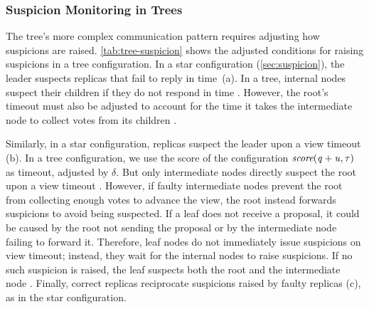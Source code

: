 \subsubsection{Suspicion Monitoring in Trees}
\label{sec:tree-suspicion}

The tree's more complex communication pattern requires adjusting how suspicions are raised.
\cref{tab:tree-suspicion} shows the adjusted conditions for raising suspicions in a tree configuration.
In a star configuration (\cref{sec:suspicion}), the leader suspects replicas that fail to reply in time~(a).
In a tree, internal nodes suspect their children if they do not respond in time .
However, the root's timeout must also be adjusted to account for the time it takes the intermediate node to collect votes from its children .

Similarly, in a star configuration, replicas suspect the leader upon a view timeout (b).
In a tree configuration, we use the score of the configuration $\textit{score}(\mathit{q}+\mathit{u},\tau)$ as timeout, adjusted by $\delta$. 
But only intermediate nodes directly suspect the root upon a view timeout .
However, if faulty intermediate nodes prevent the root from collecting enough votes to advance the view, the root instead forwards suspicions to avoid being suspected.
If a leaf does not receive a proposal, it could be caused by the root not sending the proposal or by the intermediate node failing to forward it.
Therefore, leaf nodes do not immediately issue suspicions on view timeout; instead, they wait for the internal nodes to raise suspicions.
If no such suspicion is raised, the leaf suspects both the root and the intermediate node .
Finally, correct replicas reciprocate suspicions raised by faulty replicas (c), as in the star configuration.

